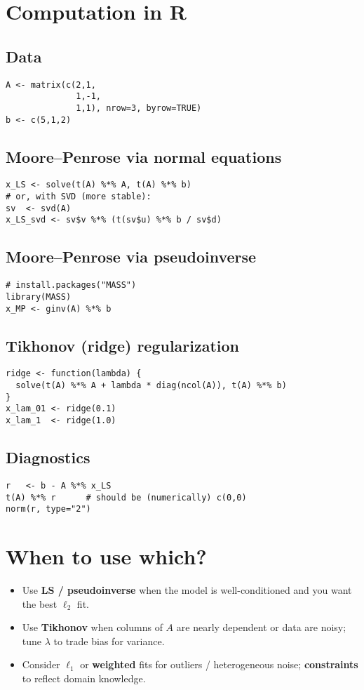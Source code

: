 \documentclass[12pt,a4paper]{article}
\begin{document}
\section{Computation in \textsf{R}}
\subsection*{Data}
\begin{verbatim}
A <- matrix(c(2,1,
              1,-1,
              1,1), nrow=3, byrow=TRUE)
b <- c(5,1,2)
\end{verbatim}

\subsection*{Moore–Penrose via normal equations}
\begin{verbatim}
x_LS <- solve(t(A) %*% A, t(A) %*% b)
# or, with SVD (more stable):
sv  <- svd(A)
x_LS_svd <- sv$v %*% (t(sv$u) %*% b / sv$d)
\end{verbatim}

\subsection*{Moore–Penrose via pseudoinverse}
\begin{verbatim}
# install.packages("MASS")
library(MASS)
x_MP <- ginv(A) %*% b
\end{verbatim}

\subsection*{Tikhonov (ridge) regularization}
\begin{verbatim}
ridge <- function(lambda) {
  solve(t(A) %*% A + lambda * diag(ncol(A)), t(A) %*% b)
}
x_lam_01 <- ridge(0.1)
x_lam_1  <- ridge(1.0)
\end{verbatim}

\subsection*{Diagnostics}
\begin{verbatim}
r   <- b - A %*% x_LS
t(A) %*% r      # should be (numerically) c(0,0)
norm(r, type="2")
\end{verbatim}

\section{When to use which?}
\begin{itemize}[leftmargin=1.4em]
\item Use \textbf{LS / pseudoinverse} when the model is well-conditioned and you want the best $\ell_2$ fit.
\item Use \textbf{Tikhonov} when columns of $A$ are nearly dependent or data are noisy; tune $\lambda$ to trade bias for variance.
\item Consider \textbf{$\ell_1$} or \textbf{weighted} fits for outliers / heterogeneous noise; \textbf{constraints} to reflect domain knowledge.
\end{itemize}
\end{document}
